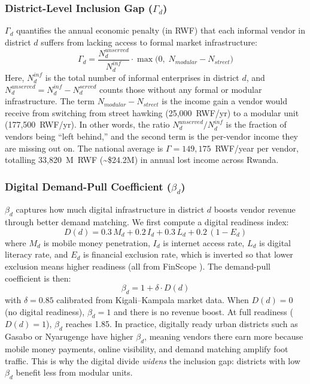 \documentclass{article}
\begin{document}
\subsubsection{District-Level Inclusion Gap ($\Gamma_d$)}
$\Gamma_d$ quantifies the annual economic penalty (in RWF) that each informal vendor in district $d$ suffers from lacking access to formal market infrastructure:
\begin{equation}
    \Gamma_d = \frac{N_d^{\textit{unserved}}}{N_d^{\textit{inf}}} \cdot \max\!\bigl(0,\; N_{\textit{modular}} - N_{\textit{street}}\bigr)
    \label{eq:gamma}
\end{equation}
Here, $N_d^{\textit{inf}}$ is the total number of informal enterprises in district $d$, and $N_d^{\textit{unserved}} = N_d^{\textit{inf}} - N_d^{\textit{served}}$ counts those without any formal or modular infrastructure.
The term $N_{\textit{modular}} - N_{\textit{street}}$ is the income gain a vendor would receive from switching from street hawking (25,000~RWF/yr) to a modular unit (177,500~RWF/yr).
In other words, the ratio $N_d^{\textit{unserved}} / N_d^{\textit{inf}}$ is the fraction of vendors being ``left behind,'' and the second term is the per-vendor income they are missing out on.
The national average is $\Gamma = 149{,}175$~RWF/year per vendor, totalling 33,820~M~RWF (\textasciitilde\$24.2M) in annual lost income across Rwanda.

\subsubsection{Digital Demand-Pull Coefficient ($\beta_d$)}
$\beta_d$ captures how much digital infrastructure in district $d$ boosts vendor revenue through better demand matching.
We first compute a digital readiness index:
\begin{equation}
    D(d) = 0.3\,M_d + 0.2\,I_d + 0.3\,L_d + 0.2\,(1 - E_d)
    \label{eq:digital}
\end{equation}
where $M_d$ is mobile money penetration, $I_d$ is internet access rate, $L_d$ is digital literacy rate, and $E_d$ is financial exclusion rate, which is inverted so that lower exclusion means higher readiness (all from FinScope \cite{finscope2020rwanda}).
The demand-pull coefficient is then:
\begin{equation}
    \beta_d = 1 + \delta \cdot D(d)
    \label{eq:beta}
\end{equation}
with $\delta = 0.85$ calibrated from Kigali--Kampala market data.
When $D(d) = 0$ (no digital readiness), $\beta_d = 1$ and there is no revenue boost.
At full readiness ($D(d) = 1$), $\beta_d$ reaches 1.85.
In practice, digitally ready urban districts such as Gasabo or Nyarugenge have higher $\beta_d$, meaning vendors there earn more because mobile money payments, online visibility, and demand matching amplify foot traffic.
This is why the digital divide \emph{widens} the inclusion gap: districts with low $\beta_d$ benefit less from modular units.
\end{document}
